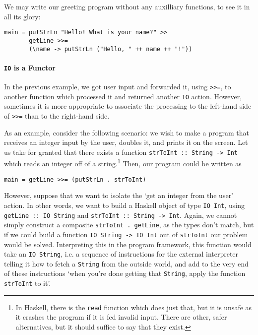 \documentclass[11	pt]{article}
\theoremstyle{nonumberplain}
\newcommand*\lsin{\lstinline}
\begin{document}
We may write our greeting program without any auxilliary functions, to see it in all its glory:
\begin{lstlisting}
main = putStrLn "Hello! What is your name?" >>
       getLine >>=
       (\name -> putStrLn ("Hello, " ++ name ++ "!"))
\end{lstlisting}


\paragraph{\texttt{IO} is a Functor}

In the previous example, we got user input and forwarded it, using \lsin|>>=|, to another function which processed it and returned another \lsin|IO| action. However, sometimes it is more appropriate to associate the processing to the left-hand side of \lsin|>>=| than to the right-hand side.

As an example, consider the following scenario: we wish to make a program that receives an integer input by the user, doubles it, and prints it on the screen. Let us take for granted that there exists a function \lsin|strToInt :: String -> Int| which reads an integer off of a string.\footnote{In Haskell, there is the \lsin|read| function which does just that, but it is unsafe as it crashes the program if it is fed invalid input. There are other, safer alternatives, but it should suffice to say that they exist.} Then, our program could be written as
\begin{lstlisting}
main = getLine >>= (putStrLn . strToInt)
\end{lstlisting}

However, suppose that we want to isolate the `get an integer from the user' action. In other words, we want to build a Haskell object of type \lsin|IO Int|, using \lsin|getLine :: IO String| and \lsin|strToInt :: String -> Int|. Again, we cannot simply construct a composite \lsin|strToInt . getLine|, as the types don't match, but if we could build a function \lsin|IO String -> IO Int| out of \lsin|strToInt| our problem would be solved. Interpreting this in the program framework, this function would take an \lsin|IO String|, i.e. a sequence of instructions for the external interpreter telling it how to fetch a \lsin|String| from the outside world, and add to the very end of these instructions `when you're done getting that \lsin|String|, apply the function \lsin|strToInt| to it'. 
\end{document}
